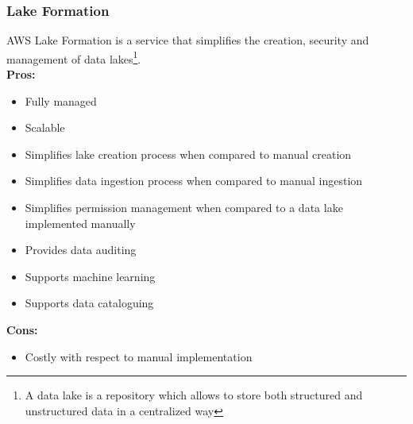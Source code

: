         \subsubsection{Lake Formation}
        \label{aws:lake-formation}
 AWS Lake Formation is a service that simplifies the creation, security and management of data lakes\footnote{A data lake is a repository which allows to store both structured and unstructured data in a centralized way}.\\
        \textbf{Pros:}
        \begin{itemize}
            \item Fully managed
            \item Scalable
            \item Simplifies lake creation process when compared to manual creation
            \item Simplifies data ingestion process when compared to manual ingestion
            \item Simplifies permission management when compared to a data lake implemented manually      
            \item Provides data auditing 
            \item Supports machine learning
            \item Supports data cataloguing
        \end{itemize}
        \textbf{Cons:}
        \begin{itemize}
            \item Costly with respect to manual implementation
        \end{itemize}

